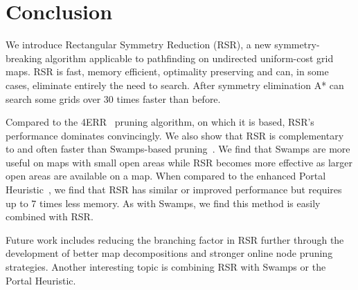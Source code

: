 \section{Conclusion}
We introduce Rectangular Symmetry Reduction (RSR), a new symmetry-breaking algorithm
applicable to pathfinding on undirected uniform-cost grid maps. RSR is fast,
memory efficient, optimality preserving and can, in some cases, eliminate
entirely the need to search.  After symmetry elimination A* can
search some grids over 30 times faster than before.
\par
Compared to the 4ERR~\cite{harabor10} pruning algorithm, on which it is based,
RSR's performance dominates convincingly.
We also show that RSR is complementary to and often faster than Swamps-based
pruning~\cite{pochter10}.
We find that Swamps are more useful on maps with small open areas
while RSR becomes more effective as larger open areas are available on a map. 
When compared to the enhanced Portal Heuristic~\cite{goldenberg10}, we find that 
RSR has similar or improved performance but requires up to 7 times less memory.
As with Swamps, we find this method is easily combined with RSR.
\par
Future work includes reducing the branching factor in RSR further through the 
development of better map decompositions and stronger online node pruning
strategies.
Another interesting topic is combining RSR with Swamps or the Portal Heuristic.
